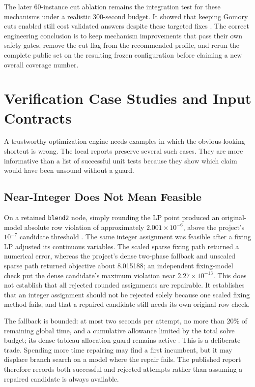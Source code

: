 \documentclass[10pt,a4paper,twocolumn]{article}
\begin{document}
The later 60-instance cut ablation remains the integration test for these mechanisms under a realistic 300-second budget. It showed that keeping Gomory cuts enabled still cost validated answers despite these targeted fixes \cite{iter37}. The correct engineering conclusion is to keep mechanism improvements that pass their own safety gates, remove the cut flag from the recommended profile, and rerun the complete public set on the resulting frozen configuration before claiming a new overall coverage number.

\section{Verification Case Studies and Input Contracts}

A trustworthy optimization engine needs examples in which the obvious-looking shortcut is wrong. The local reports preserve several such cases. They are more informative than a list of successful unit tests because they show which claim would have been unsound without a guard.

\subsection{Near-Integer Does Not Mean Feasible}

On a retained \texttt{blend2} node, simply rounding the LP point produced an original-model absolute row violation of approximately $2.001\times10^{-6}$, above the project's $10^{-7}$ candidate threshold \cite{repairmethod}. The same integer assignment was feasible after a fixing LP adjusted its continuous variables. The scaled sparse fixing path returned a numerical error, whereas the project's dense two-phase fallback and unscaled sparse path returned objective about 8.015188; an independent fixing-model check put the dense candidate's maximum violation near $2.27\times10^{-13}$. This does not establish that all rejected rounded assignments are repairable. It establishes that an integer assignment should not be rejected solely because one scaled fixing method fails, and that a repaired candidate still needs its own original-row check.

The fallback is bounded: at most two seconds per attempt, no more than 20\% of remaining global time, and a cumulative allowance limited by the total solve budget; its dense tableau allocation guard remains active \cite{repairmethod}. This is a deliberate trade. Spending more time repairing may find a first incumbent, but it may displace branch search on a model where the repair fails. The published report therefore records both successful and rejected attempts rather than assuming a repaired candidate is always available.
\end{document}
